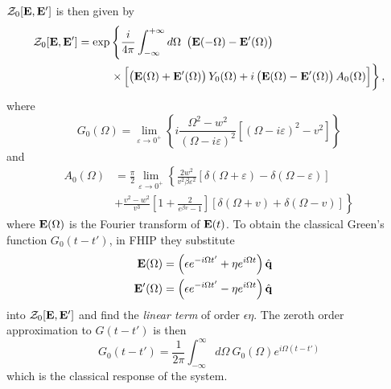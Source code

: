 $\mathcal{Z}_0[\vb{E}, \vb{E}']$ is then given by
\begin{equation}\label{eqn:Z0}
    \begin{aligned}
        \mathcal{Z}_0[\vb{E}, \vb{E}'] = \exp &\left\{ \frac{i}{4\pi} \int^{+\infty}_{-\infty}d\Omega\ \left( \vb{E}(-\Omega) - \vb{E}'(\Omega) \right) \right. \\
        &\left. \times \left[ \left( \vb{E}(\Omega) + \vb{E}'(\Omega) \right) Y_0(\Omega)
         + i \left( \vb{E}(\Omega) - \vb{E}'(\Omega) \right) A_0(\Omega) \right]\right\},
    \end{aligned}
\end{equation}
where
\begin{equation}
    G_0(\Omega) = \lim_{\varepsilon \to 0^+} \left\{ i\frac{\Omega^2 - w^2}{(\Omega - i\varepsilon)^2} \left[ (\Omega - i\varepsilon)^2 - v^2 \right]\right\}
\end{equation}
and
\begin{equation}
    \begin{aligned}
        A_0(\Omega) &= \frac{\pi}{2} \lim_{\varepsilon \to 0^+} \left\{ \frac{2w^2}{v^2\beta\varepsilon^2} \left[ \delta(\Omega + \varepsilon) - \delta(\Omega - \varepsilon) \right] \right. \\
        &\left. + \frac{v^2 - w^2}{v^3} \left[ 1 + \frac{2}{e^{\beta v} - 1} \right] \left[ \delta(\Omega + v) + \delta(\Omega - v) \right] \right\}
    \end{aligned}
\end{equation}
where $\vb{E}(\Omega)$ is the Fourier transform of $\vb{E}(t)$. To obtain the classical Green's function $G_0(t-t')$, in FHIP they substitute
\begin{subequations}
\begin{align}
    \begin{split}
        \vb{E}(\Omega)& = \left(\epsilon e^{-i\Omega t'} + \eta e^{i \Omega t}\right) \hat{\vb{q}}
    \end{split}\\
    \begin{split}
        \vb{E}'(\Omega) &= \left(\epsilon e^{-i\Omega t'} - \eta e^{i \Omega t} \right) \hat{\vb{q}}
    \end{split}
\end{align}
\end{subequations}
into $\mathcal{Z}_0[\vb{E}, \vb{E}']$ and find the \emph{linear term} of order $\epsilon \eta$. The zeroth order approximation to $G(t - t')$ is then
\begin{equation}
    G_0(t - t') = \frac{1}{2\pi} \int^\infty_{-\infty} d\Omega\ G_0(\Omega) e^{i\Omega(t - t')} 
\end{equation}
which is the classical response of the system. 

